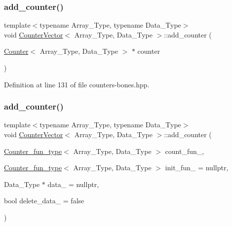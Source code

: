 \subsubsection{\texorpdfstring{add\+\_\+counter()}{add\_counter()}\hspace{0.1cm}{\footnotesize\ttfamily [2/3]}}
{\footnotesize\ttfamily template$<$typename Array\+\_\+\+Type, typename Data\+\_\+\+Type$>$ \\
void \hyperlink{class_counter_vector}{Counter\+Vector}$<$ Array\+\_\+\+Type, Data\+\_\+\+Type $>$\+::add\+\_\+counter (\begin{DoxyParamCaption}\item[{\hyperlink{class_counter}{Counter}$<$ Array\+\_\+\+Type, Data\+\_\+\+Type $>$ $\ast$}]{counter }\end{DoxyParamCaption})\hspace{0.3cm}{\ttfamily [inline]}}



Definition at line 131 of file counters-\/bones.\+hpp.

\mbox{\label{class_counter_vector_adb32ff1af45bc05a292a5cb064dc414d}} 
\subsubsection{\texorpdfstring{add\+\_\+counter()}{add\_counter()}\hspace{0.1cm}{\footnotesize\ttfamily [3/3]}}
{\footnotesize\ttfamily template$<$typename Array\+\_\+\+Type, typename Data\+\_\+\+Type$>$ \\
void \hyperlink{class_counter_vector}{Counter\+Vector}$<$ Array\+\_\+\+Type, Data\+\_\+\+Type $>$\+::add\+\_\+counter (\begin{DoxyParamCaption}\item[{\hyperlink{typedefs_8hpp_ac0160f52f564dea3ac033b374cffbfe7}{Counter\+\_\+fun\+\_\+type}$<$ Array\+\_\+\+Type, Data\+\_\+\+Type $>$}]{count\+\_\+fun\+\_\+,  }\item[{\hyperlink{typedefs_8hpp_ac0160f52f564dea3ac033b374cffbfe7}{Counter\+\_\+fun\+\_\+type}$<$ Array\+\_\+\+Type, Data\+\_\+\+Type $>$}]{init\+\_\+fun\+\_\+ = {\ttfamily nullptr},  }\item[{Data\+\_\+\+Type $\ast$}]{data\+\_\+ = {\ttfamily nullptr},  }\item[{bool}]{delete\+\_\+data\+\_\+ = {\ttfamily false} }\end{DoxyParamCaption})\hspace{0.3cm}{\ttfamily [inline]}}




